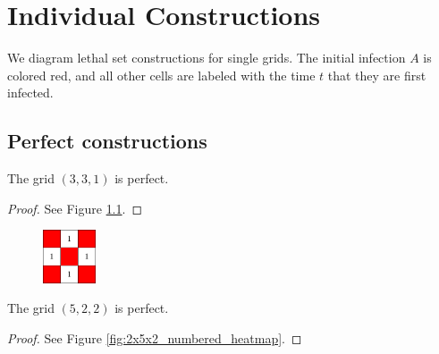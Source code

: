 \appendix
\chapter{Individual Constructions}

We diagram lethal set constructions for single grids. The initial infection $A$ is colored red, and all other cells are labeled with the time $t$ that they are first infected. 

\section{Perfect constructions}

\begin{con}
\label{con:3x3x1}
The grid $(3,3,1)$ is perfect.
\end{con}

\begin{proof}
See Figure \ref{fig:3x3x1_numbered_heatmap}.
\end{proof}

\begin{figure}[H]
\centering
\includegraphics[width=0.14\textwidth]{figures/A/3x3x1_numbered_heatmap.pdf}
\caption{}
\label{fig:3x3x1_numbered_heatmap}
\end{figure}




\begin{con}
\label{con:5x2x2}
The grid $(5,2,2)$ is perfect.
\end{con}

\begin{proof}
See Figure \ref{fig:2x5x2_numbered_heatmap}.
\end{proof}

